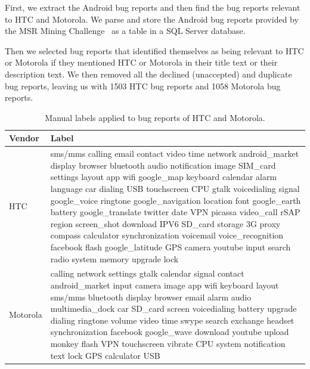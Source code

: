 \documentclass[10pt, conference, compsocconf]{IEEEtran}
\begin{document}

First, we
extract the Android bug reports and then find
the bug reports relevant to HTC and Motorola.  We parse and store the
Android bug reports provided by the MSR Mining
Challenge~\cite{MSRChallenge2012} as a table in a SQL Server database.


Then we selected bug reports that identified themselves as being
relevant to HTC or Motorola if they mentioned HTC or Motorola in their
title text or their description text.
We then removed all the declined (unaccepted) and duplicate bug reports, leaving us
with 1503 HTC bug reports and 1058 Motorola bug reports.

\begin{table}[!t]
\caption{Manual labels applied to bug reports of HTC and Motorola.}
\label{selected1}
\centering
\begin{tabular}{|m{1.3cm}<{\centering}|m{}<{\centering}|}
\hline
Vendor & Label\\
\hline
HTC & sms\//mms calling email contact video time network
    android\_market display browser bluetooth audio 
    notification image SIM\_card settings layout app 
    wifi google\_map keyboard calendar alarm language car 
    dialing USB touchscreen CPU gtalk voicedialing signal 
    google\_voice ringtone google\_navigation location font 
    google\_earth battery google\_translate twitter date VPN 
    picassa video\_call rSAP region screen\_shot download 
    IPV6 SD\_card storage 3G proxy compass calculator 
    synchronization  voicemail  voice\_recognition facebook flash 
    google\_latitude GPS camera youtube input search radio 
    system memory  upgrade  lock \\
\hline
Motorola & calling network settings gtalk calendar signal contact
      android\_market input camera image app wifi keyboard
      layout sms\//mms bluetooth display browser email
  alarm audio multimedia\_dock car SD\_card screen
  voicedialing battery upgrade dialing ringtone volume
  video time swype search exchange headset synchronization
  facebook google\_wave download youtube upload
  monkey flash VPN touchscreen vibrate CPU system
  notification text lock GPS calculator  USB\\
\hline
\end{tabular}
\end{table}
\end{document}
